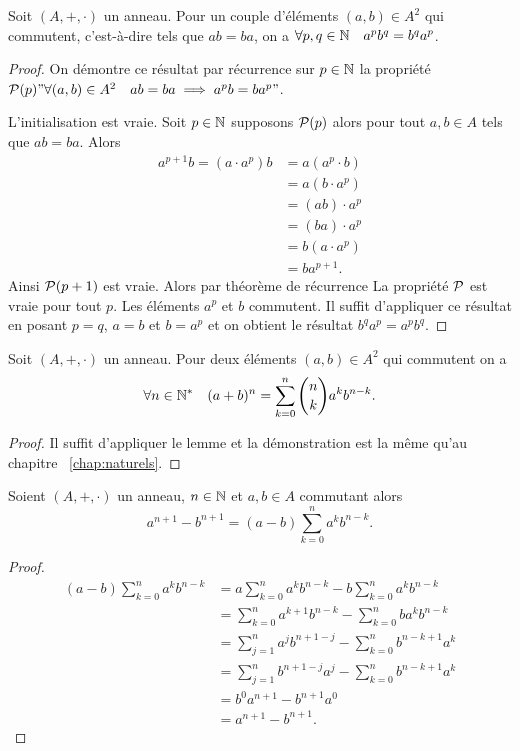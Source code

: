 \begin{lemme}
  Soit \((A,+,\cdot)\) un anneau. Pour un couple d'éléments \((a,b) \in A^2\) 
  qui commutent, c'est-à-dire tels que \(ab=ba\), on a \(\forall p,q \in \N 
  \quad a^pb^q=b^qa^p\).
\end{lemme}
\begin{proof}
  On démontre ce résultat par récurrence sur \(p \in \N\) la propriété \(\P(p) 
  "\forall (a,b) \in A^2 \quad ab=ba \implies a^pb=ba^p"\).

  L'initialisation est vraie. Soit \(p \in \N\) supposons \(\P(p)\) alors pour 
  tout \(a,b \in A\) tels que \(ab=ba\). Alors
  \begin{align}
    a^{p+1}b=(a \cdot a^p)b&=a(a^p \cdot b) \\
    &=a(b\cdot a^p)\\
    &=(ab) \cdot a^p\\
    &=(ba) \cdot a^p\\
    &=b(a \cdot a^p)\\
    &=b a^{p+1}.
  \end{align}
  Ainsi \(\P(p+1)\) est vraie. Alors par théorème de récurrence La propriété 
  \(\P\) est vraie pour tout \(p\). Les éléments \(a^p\) et \(b\) commutent. Il 
  suffit d'appliquer ce résultat en posant \(p=q\), \(a=b\) et \(b=a^p\) et on 
  obtient le résultat \(b^qa^p=a^pb^q\).
\end{proof}
\begin{theo}
  Soit \((A,+,\cdot)\) un anneau. Pour deux éléments \((a,b) \in A^2\) qui 
  commutent on a
  \begin{equation}
    \forall n \in \N^* \quad (a+b)^n=\sum_{k=0}^n \binom{n}{k} a^k b^{n-k}.
  \end{equation}
\end{theo}
\begin{proof}
  Il suffit d'appliquer le lemme et la démonstration est la même qu'au chapitre~
  \ref{chap:naturels}.
\end{proof}
\begin{theo}
  Soient \((A,+,\cdot)\) un anneau, \(n \in \N\) et \(a,b \in A\) commutant 
  alors
  \begin{equation}
    a^{n+1}-b^{n+1}=(a-b)\sum_{k=0}^n a^kb^{n-k}.
  \end{equation}
\end{theo}
\begin{proof}
  \begin{align}
    (a-b)\sum_{k=0}^n a^kb^{n-k} &= a \sum_{k=0}^n a^kb^{n-k} - b \sum_{k=0}^n 
    a^kb^{n-k}\\
    &=\sum_{k=0}^n a^{k+1}b^{n-k} - \sum_{k=0}^n ba^kb^{n-k}\\
    &=\sum_{j=1}^n a^jb^{n+1-j} - \sum_{k=0}^n b^{n-k+1}a^k \\
    &=\sum_{j=1}^n b^{n+1-j}a^j - \sum_{k=0}^n b^{n-k+1}a^k \\
    &=b^0a^{n+1}-b^{n+1}a^0\\
    &=a^{n+1}-b^{n+1}.
  \end{align}
\end{proof}
